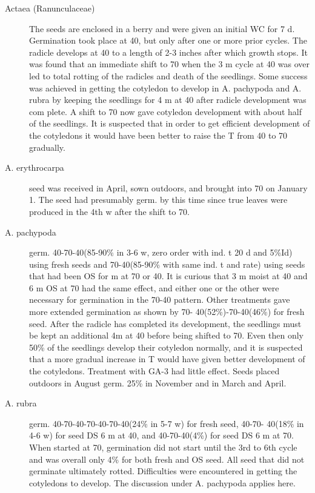 \begin{description}
\item[Actaea (Ranunculaceae)] The seeds are enclosed in a berry and were
given an initial WC for 7 d. Germination took place at 40, but only after one or more
prior cycles. The radicle develops at 40 to a length of 2-3 inches after which growth
stops. It was found that an immediate shift to 70 when the 3 m cycle at 40 was over led
to total rotting of the radicles and death of the seedlings. Some success was achieved
in getting the cotyledon to develop in A. pachypoda and A. rubra by keeping the
seedlings for 4 m at 40 after radicle development was com plete. A shift to 70 now
gave cotyledon development with about half of the seedlings. It is suspected that in
order to get efficient development of the cotyledons it would have been better to raise
the T from 40 to 70 gradually.

\item[A. erythrocarpa] seed was received in April, sown outdoors, and brought into 70
on January 1. The seed had presumably germ. by this time since true leaves were
produced in the 4th w after the shift to 70.

\item[A. pachypoda] germ. 40-70-40(85-90\% in 3-6 w, zero order with ind. t 20 d and
5\%Id) using fresh seeds and 70-40(85-90\% with same ind. t and rate) using seeds that
had been OS for m at 70 or 40. It is curious that 3 m moist at 40 and 6 m OS at 70
had the same effect, and either one or the other were necessary for germination in the
70-40 pattern. Other treatments gave more extended germination as shown by 70-
40(52\%)-70-40(46\%) for fresh seed. After the radicle has completed its development,
the seedlings must be kept an additional 4m at 40 before being shifted to 70. Even
then only 50\% of the seedlings develop their cotyledon normally, and it is suspected
that a more gradual increase in T would have given better development of the
cotyledons. Treatment with GA-3 had little effect. Seeds placed outdoors in August
germ. 25\% in November and in March and April.

\item[A. rubra] germ. 40-70-40-70-40-70-40(24\% in 5-7 w) for fresh seed, 40-70-
40(18\% in 4-6 w) for seed DS 6 m at 40, and 40-70-40(4\%) for seed DS 6 m at 70.
When started at 70, germination did not start until the 3rd to 6th cycle and was overall
only 4\% for both fresh and OS seed. All seed that did not germinate ultimately rotted.
Difficulties were encountered in getting the cotyledons to develop. The discussion
under A. pachypoda applies here.


\end{description}
